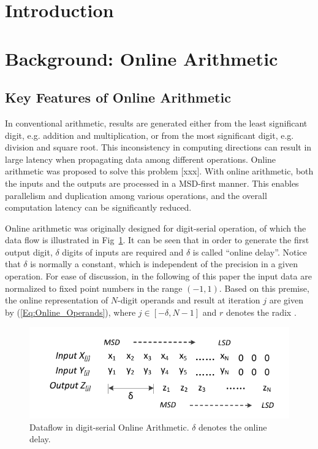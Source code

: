 \documentclass[conference]{IEEEtran}
\begin{document}
\section{Introduction}


\section{Background: Online Arithmetic}
\subsection{Key Features of Online Arithmetic}
In conventional arithmetic, results are generated either from the least significant digit, e.g. addition and multiplication, or from the most significant digit, e.g. division and square root. This inconsistency in computing directions can result in large latency when propagating data among different operations. Online arithmetic was proposed to solve this problem [xxx]. With online arithmetic, both the inputs and the outputs are processed in a MSD-first manner. This enables parallelism and duplication among various operations, and the overall computation latency can be significantly reduced.

Online arithmetic was originally designed for digit-serial operation, of which the data flow is illustrated in Fig~\ref{Fig:OnlineDataFlow}. It can be seen that in order to generate the first output digit, $\delta$ digits of inputs are required and $\delta$ is called ``online delay''. Notice that $\delta$ is normally a constant, which is independent of the precision in a given operation. For ease of discussion, in the following of this paper the input data are normalized to fixed point numbers in the range $(-1,1)$. Based on this premise, the online representation of $N$-digit operands and result at iteration $j$ are given by (\ref{Eq:Online_Operands}), where $j\in[-\delta,N-1]$ and $r$ denotes the radix \cite{Ercegovac_Book}.

\begin{figure}[htbp]
  \centering
  \includegraphics[width=.48\textwidth]{./Figures/OnlineArithmetic_DataFlow.pdf}
  \caption{Dataflow in digit-serial Online Arithmetic. $\delta$ denotes the online delay.}
  \label{Fig:OnlineDataFlow}
\end{figure}
\end{document}

